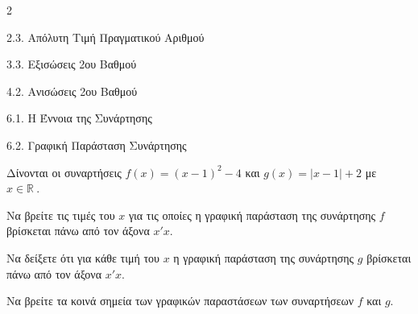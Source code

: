 \begin{ylh}{2}
    \item 2.3. Απόλυτη Τιμή Πραγματικού Αριθμού
    \item 3.3. Εξισώσεις 2ου Βαθμού
    \item 4.2. Ανισώσεις 2ου Βαθμού
    \item 6.1. Η Έννοια της Συνάρτησης
    \item 6.2. Γραφική Παράσταση Συνάρτησης
\end{ylh}
Δίνονται οι συναρτήσεις $f(x) = (x - 1)^{2} - 4$ και $g(x) = |x - 1| + 2$ με $x\mathbb{\in R\ .}$

\begin{alist}
\item Να βρείτε τις τιμές του $x$ για τις οποίες η γραφική παράσταση της συνάρτησης $f$ βρίσκεται πάνω από τον άξονα $x'x$.
\item Να δείξετε ότι για κάθε τιμή του $x$ η γραφική παράσταση της συνάρτησης $g$ βρίσκεται πάνω από τον άξονα $x'x$.
\item Να βρείτε τα κοινά σημεία των γραφικών παραστάσεων των συναρτήσεων $f$ και $g$.
\end{alist}

